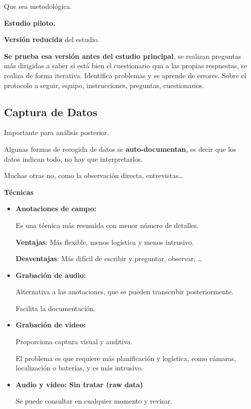 \documentclass[12pt]{report} %
\begin{document}
Que sea metodológica.

\textbf{Estudio piloto.}

\textbf{Versión reducida} del estudio.

\textbf{Se prueba esa versión antes del estudio principal}, se realizan
preguntas más dirigidas a saber si está bien el cuestionario qua a las
propias respuestas, se realiza de forma iterativa. Identifica problemas
y se aprende de errores. Sobre el protocolo a seguir, equipo,
instrucciones, preguntas, cuestionarios.

\subsection{Captura de Datos}

Importante para análisis posterior.

Algunas formas de recogida de datos se \textbf{auto-documentan}, es decir que los datos indican todo, no hay que interpretarlos.

Muchas otras no, como la observación directa, entrevistas\ldots{}

\newpage

\textbf{Técnicas}

\begin{itemize}
\item
  \textbf{Anotaciones de campo:}

  Es una técnica más resumida con menor número de detalles.

  \textbf{Ventajas}: Más flexible, menos logística y menos intrusivo.

  \textbf{Desventajas}: Más difícil de escribir y preguntar, observar,
  \ldots{}
\item
  \textbf{Grabación de audio:}

  Alternativa a las anotaciones, que se pueden transcribir
  posteriormente.

  Facilita la documentación.
\item
  \textbf{Grabación de video:}

  Proporciona captura visual y auditiva.

  El problema es que requiere más planificación y logística, como
  cámaras, localización o baterías, y es más intrusivo.
\item
  \textbf{Audio y video: Sin tratar (raw data)}

  Se puede consultar en cualquier momento y revisar.
\end{itemize}
\end{document}
